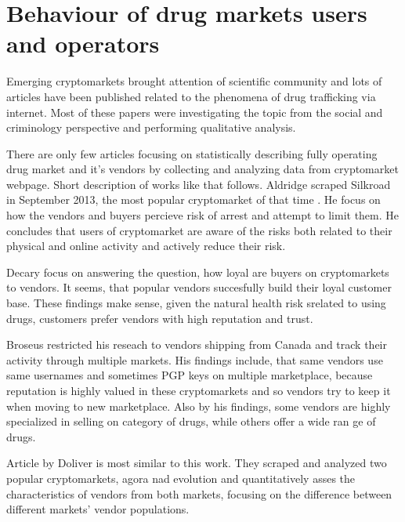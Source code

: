 \documentclass[
  digital, %
  table,   %
  lof,     %
  lot,     %
  oneside
]{fithesis3}
\begin{document}
\section{Behaviour of drug markets users and operators}

Emerging cryptomarkets brought attention of scientific community
and lots of articles have been published related to the phenomena of drug trafficking via internet.
Most of these papers were investigating the topic from the social
and criminology perspective and performing qualitative analysis.
\parencite{aldridge2014not}
\parencite{barratt2014use}
\parencite{christin2013traveling}
\parencite{dolliver2015criminogenic}
\parencite{van2013silk}
\parencite{walsh2011drugs}
\parencite{martin2014lost}

There are only few articles focusing on statistically describing fully operating drug market and it's vendors
by collecting and analyzing data from cryptomarket webpage. Short description of works like that follows.
Aldridge \parencite{aldridge2017delivery} scraped Silkroad in September 2013, the most popular cryptomarket of that time
.
He focus on how the vendors and buyers percieve risk of arrest and attempt to limit them.
He concludes that users of cryptomarket are aware of the risks both related to their physical and online activity
and actively reduce their risk.

Decary \parencite{decary2017repeat} focus on answering the question, how loyal are buyers 
on cryptomarkets to vendors. It seems, that popular vendors succesfully build their loyal
customer base. These findings make sense, given the natural health risk srelated to using drugs,
customers prefer vendors with high reputation and trust.

Broseus \parencite{broseus2016studying} restricted his reseach to vendors shipping from Canada
and track their activity through multiple markets. His findings include, that same vendors
use same usernames and sometimes PGP keys on multiple marketplace, because reputation
is highly valued in these cryptomarkets and so vendors try to keep it when moving to new marketplace.
Also by his findings, some vendors are highly specialized in selling on category of drugs, while others offer a wide ran
ge of drugs.

Article by Doliver \parencite{dolliver2016characteristics} is most similar to this work.
They scraped and analyzed two popular cryptomarkets, agora nad evolution and quantitatively asses
the characteristics of vendors from both markets, focusing on the difference
 between different markets' vendor populations.
\end{document}
